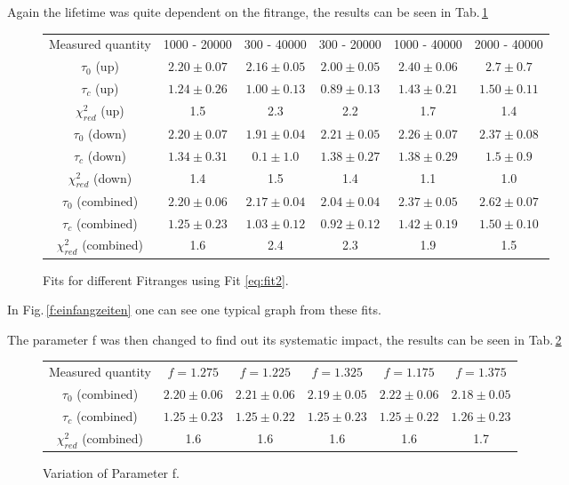 Again the lifetime was quite dependent on the fitrange, the results can be seen in Tab.\,\ref{t:einfangzeiten}

\begin{figure}
\begin{tabularx}{\textwidth}{| c | c | c | c | c | c |}
Measured quantity & 1000 - 20000 & 300 - 40000 & 300 - 20000 & 1000 - 40000 & 2000 - 40000\\
$\tau_0$ (up) & $2.20\pm0.07$ & $2.16\pm0.05$ & $2.00\pm0.05$ & $2.40\pm0.06$ & $2.7\pm0.7  $ \\
$\tau_c$ (up) & $1.24\pm0.26$ & $1.00\pm0.13$ & $0.89\pm0.13$ & $1.43\pm0.21$ & $1.50\pm0.11$ \\
$\chi^2_{red}$ (up) & 1.5 & 2.3 & 2.2 & 1.7 & 1.4 \\
$\tau_0$ (down) & $2.20\pm0.07$ & $1.91\pm 0.04$ & $2.21\pm0.05$ & $2.26\pm0.07$ & $2.37\pm0.08$ \\
$\tau_c$ (down) & $1.34\pm0.31$ & $0.1\pm1.0$ & $1.38 \pm 0.27$  & $1.38\pm0.29$ & $1.5\pm0.9  $ \\
$\chi^2_{red}$ (down) & 1.4 & 1.5 & 1.4 & 1.1 & 1.0 \\
$\tau_0$ (combined) & $2.20\pm0.06$ & $2.17\pm0.04$ & $2.04\pm0.04$ & $2.37\pm0.05$ & $2.62\pm0.07$ \\
$\tau_c$ (combined) & $1.25\pm0.23$ & $1.03\pm0.12$ & $0.92\pm0.12$ & $1.42\pm0.19$ & $1.50\pm0.10$ \\
$\chi^2_{red}$ (combined) & 1.6 & 2.4 & 2.3 & 1.9 & 1.5
\end{tabularx}
\caption{Fits for different Fitranges using Fit \ref{eq:fit2}.}
\label{t:einfangzeiten}
\end{figure}
In Fig.\,\ref{f:einfangzeiten} one can see one typical graph from these fits. %


The parameter f was then changed to find out its systematic impact, the results can be seen in Tab.\,\ref{t:varf}
\begin{figure}
\begin{tabularx}{\textwidth}{| c | c | c | c | c | c |}
Measured quantity & $f=1.275$ & $f = 1.225$ & $f=1.325$ & $f = 1.175$ & $f = 1.375$\\
$\tau_0$ (combined) & $2.20\pm0.06$ & $2.21\pm0.06$ & $2.19\pm0.05$ & $2.22\pm0.06$ & $2.18\pm0.05$ \\
$\tau_c$ (combined) & $1.25\pm0.23$ & $1.25\pm0.22$ & $1.25\pm0.23$ & $1.25\pm0.22$ & $1.26\pm0.23$ \\
$\chi^2_{red}$ (combined) & 1.6 & 1.6 & 1.6 & 1.6 & 1.7
\end{tabularx}
\caption{Variation of Parameter f.}
\label{t:varf}
\end{figure}

